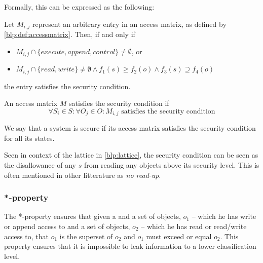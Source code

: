 Formally, this can be expressed as the following:
\begin{definition}
Let $M_{i,j}$ represent an arbitrary entry in an access matrix, as defined by \cref{blp:def:accessmatrix}.
Then, if and only if
\begin{itemize}
  \item $M_{i,j} \cap \{execute, append, control\} \neq \emptyset$, or
  \item $M_{i,j} \cap \{read, write\} \neq \emptyset \wedge f_1(s) \ge f_2(o) \wedge f_3(s) \supseteq f_4(o)$
\end{itemize}
the entry satisfies the security condition.

\end{definition}
\begin{definition}
An access matrix $M$ satisfies the security condition if
$$\forall S_i \in S: \forall O_j \in O: M_{i,j} \text{ satisfies the security condition}$$

We say that a system is secure if its access matrix satisfies the security condition for all its states.
\end{definition}

Seen in context of the lattice in \cref{blp:lattice}, the security condition can be seen as the disallowance of any \ssubject{} $s$ from reading any objects above its security level.
This is often mentioned in other litterature as \emph{no read-up}.

\subsubsection{*-property}
The *-property ensures that given a \principal{} and a set of objects, $o_1$ -- which he has write or append access to and a set of objects, $o_2$ -- which he has read or read/write access to, that $o_1$ is the superset of $o_2$ and $o_1$ must exceed or equal $o_2$.
This property ensures that it is impossible to leak information to a lower classification level.

